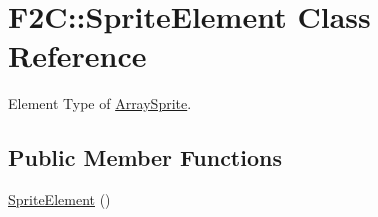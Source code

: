 \hypertarget{class_f2_c_1_1_sprite_element}{
\section{F2C::SpriteElement Class Reference}
\label{class_f2_c_1_1_sprite_element}
}


Element Type of \hyperlink{class_f2_c_1_1_array_sprite}{ArraySprite}.  


\subsection*{Public Member Functions}
\begin{DoxyCompactItemize}
\item 
\hypertarget{class_f2_c_1_1_sprite_element_a197d9960d5ea7808abf99e3ecdcbbd51}{
\hyperlink{class_f2_c_1_1_sprite_element_a197d9960d5ea7808abf99e3ecdcbbd51}{SpriteElement} ()}
\label{class_f2_c_1_1_sprite_element_a197d9960d5ea7808abf99e3ecdcbbd51}


\end{DoxyCompactItemize}
